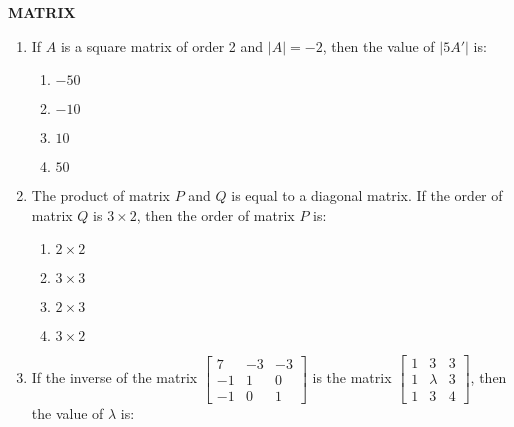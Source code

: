 \documentclass[12pt,-letter paper]{article}
\providecommand{\myvec}[1]{\ensuremath{\begin{bmatrix}#1\end{bmatrix}}}
\providecommand{\brak}[1]{\ensuremath{\left(#1\right)}}
\begin{document}
\begin{center}                                                              \textbf{MATRIX}                                                     \end{center}                                                                                                                         \begin{enumerate}                                                           \item If $A$ is a square matrix of order 2 and \(|A| = -2\), then the value of \(|5A'|\) is:                                                            \begin{enumerate}[label={$\brak{\Alph*}$}]
        \item $-50$
        \item $-10$                                                             \item $10$                                                              \item $50$                                                          \end{enumerate}                                                                                                                                 \item The product of matrix $P$ and $Q$ is equal to a diagonal matrix. If the order of matrix $Q$ is \(3 \times 2\), then the order of matrix $P$ is:                                                                   \begin{enumerate}[label={$\brak{\Alph*}$}]                                  \item $2 \times 2$                                                      \item $3 \times 3$                                                      \item $2 \times 3$                                                      \item $3 \times 2$                                                          \end{enumerate}                                                                                                                        \item If the inverse of the matrix $\myvec{7 & -3 & -3 \\ -1 & 1 & 0 \\ -1 & 0 & 1}$ is the matrix $\myvec{1 & 3 & 3 \\ 1 & \lambda & 3 \\ 1 & 3 & 4}$, then the value of $\lambda$ is:

\end{enumerate}
\end{document}
